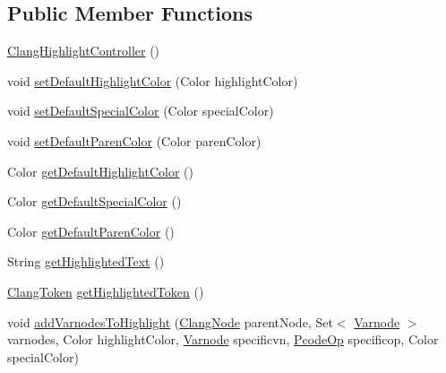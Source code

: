 \subsection*{Public Member Functions}
\begin{DoxyCompactItemize}
\item 
\mbox{\hyperlink{classghidra_1_1app_1_1decompiler_1_1component_1_1_clang_highlight_controller_acb762e5a9363b0d4fc31259911170beb}{Clang\+Highlight\+Controller}} ()
\item 
void \mbox{\hyperlink{classghidra_1_1app_1_1decompiler_1_1component_1_1_clang_highlight_controller_a3b4cb1d379592af31fe3bbe343dedee2}{set\+Default\+Highlight\+Color}} (Color highlight\+Color)
\item 
void \mbox{\hyperlink{classghidra_1_1app_1_1decompiler_1_1component_1_1_clang_highlight_controller_acb4b9b150af0045145a5fec568d7e44f}{set\+Default\+Special\+Color}} (Color special\+Color)
\item 
void \mbox{\hyperlink{classghidra_1_1app_1_1decompiler_1_1component_1_1_clang_highlight_controller_af02bc659bcb9e90e101fab6e46326c38}{set\+Default\+Paren\+Color}} (Color paren\+Color)
\item 
Color \mbox{\hyperlink{classghidra_1_1app_1_1decompiler_1_1component_1_1_clang_highlight_controller_a1b38e16959bc1bb28352f2c6e24be281}{get\+Default\+Highlight\+Color}} ()
\item 
Color \mbox{\hyperlink{classghidra_1_1app_1_1decompiler_1_1component_1_1_clang_highlight_controller_a4e935ff3c010cb5ae5f91c918a9e7328}{get\+Default\+Special\+Color}} ()
\item 
Color \mbox{\hyperlink{classghidra_1_1app_1_1decompiler_1_1component_1_1_clang_highlight_controller_a991290864e92c02a78a710c8591e7e81}{get\+Default\+Paren\+Color}} ()
\item 
String \mbox{\hyperlink{classghidra_1_1app_1_1decompiler_1_1component_1_1_clang_highlight_controller_aa9dfe1defeb71f044949dc05e557ad62}{get\+Highlighted\+Text}} ()
\item 
\mbox{\hyperlink{classghidra_1_1app_1_1decompiler_1_1_clang_token}{Clang\+Token}} \mbox{\hyperlink{classghidra_1_1app_1_1decompiler_1_1component_1_1_clang_highlight_controller_ad3cddab4e55065b1704d6ecd191a553f}{get\+Highlighted\+Token}} ()
\item 
void \mbox{\hyperlink{classghidra_1_1app_1_1decompiler_1_1component_1_1_clang_highlight_controller_a415977d3fa133edd37c344be0371cfcb}{add\+Varnodes\+To\+Highlight}} (\mbox{\hyperlink{interfaceghidra_1_1app_1_1decompiler_1_1_clang_node}{Clang\+Node}} parent\+Node, Set$<$ \mbox{\hyperlink{class_varnode}{Varnode}} $>$ varnodes, Color highlight\+Color, \mbox{\hyperlink{class_varnode}{Varnode}} specificvn, \mbox{\hyperlink{class_pcode_op}{Pcode\+Op}} specificop, Color special\+Color)

\end{DoxyCompactItemize}
